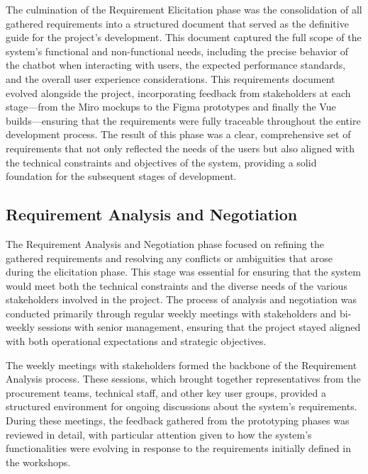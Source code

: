 
The culmination of the Requirement Elicitation phase was the consolidation of all gathered requirements into a
structured document that served as the definitive guide for the project’s development. This document captured the full
scope of the system’s functional and non-functional needs, including the precise behavior of the chatbot when
interacting with users, the expected performance standards, and the overall user experience considerations. This
requirements document evolved alongside the project, incorporating feedback from stakeholders at each stage—from the
Miro mockups to the Figma prototypes and finally the Vue builds—ensuring that the requirements were fully traceable
throughout the entire development process. The result of this phase was a clear, comprehensive set of requirements that
not only reflected the needs of the users but also aligned with the technical constraints and objectives of the system,
providing a solid foundation for the subsequent stages of development.

\subsection{Requirement Analysis and Negotiation}\label{subsec:requirement-analysis-and-negotiation}

The Requirement Analysis and Negotiation phase focused on refining the gathered requirements and resolving any conflicts
or ambiguities that arose during the elicitation phase. This stage was essential for ensuring that the system would meet
both the technical constraints and the diverse needs of the various stakeholders involved in the project. The process of
analysis and negotiation was conducted primarily through regular weekly meetings with stakeholders and bi-weekly
sessions with senior management, ensuring that the project stayed aligned with both operational expectations and
strategic objectives.

The weekly meetings with stakeholders formed the backbone of the Requirement Analysis process. These sessions, which
brought together representatives from the procurement teams, technical staff, and other key user groups, provided a
structured environment for ongoing discussions about the system’s requirements. During these meetings, the feedback
gathered from the prototyping phases was reviewed in detail, with particular attention given to how the system’s
functionalities were evolving in response to the requirements initially defined in the workshops.

